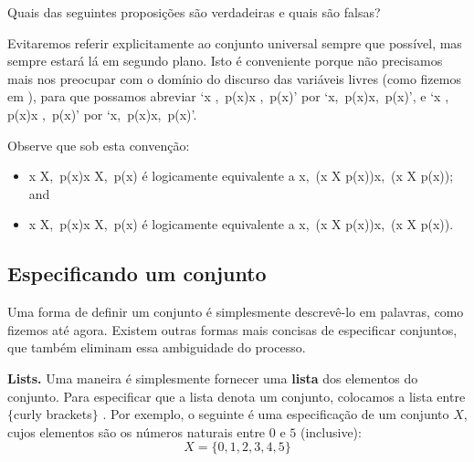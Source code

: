 \begin{exercise}
Quais das seguintes proposições são verdadeiras e quais são falsas?
  \in {} \qquad {} \in {} \qquad {} \in {} \qquad {} \in {} \qquad {} \in {}   \in {} \qquad {} \in {} \qquad {} \in {} \qquad {} \in {} \qquad {} \in {} 
\end{exercise}

Evitaremos referir explicitamente ao conjunto universal  sempre que possível, mas sempre estará lá em segundo plano. Isto é conveniente porque não precisamos mais nos preocupar com o domínio do discurso das variáveis ​​livres (como fizemos em ), para que possamos abreviar `\forall x \in {},\, p(x)\forall x \in {},\, p(x)' por `\forall x,\, p(x)\forall x,\, p(x)', e `\exists x \in {},\, p(x)\exists x \in {},\, p(x)' por `\exists x,\, p(x)\exists x,\, p(x)'.

Observe que sob esta convenção:
\begin{itemize}
\item \forall x \in X,\, p(x)\forall x \in X,\, p(x) é logicamente equivalente a \forall x,\, (x \in X \Rightarrow p(x))\forall x,\, (x \in X \Rightarrow p(x)); and
\item \exists x \in X,\, p(x)\exists x \in X,\, p(x) é logicamente equivalente a \exists x,\, (x \in X \wedge p(x))\exists x,\, (x \in X \wedge p(x)).
\end{itemize}

\subsection*{Especificando um conjunto}
Uma forma de definir um conjunto é simplesmente descrevê-lo em palavras, como fizemos até agora. Existem outras formas mais concisas de especificar conjuntos, que também eliminam essa ambiguidade do processo.

\textbf{Lists.}
Uma maneira é simplesmente fornecer uma \textbf{lista} dos elementos do conjunto. Para especificar que a lista denota um conjunto, colocamos a lista entre $\{$curly brackets$\}$ \inlatex{\{,\textbackslash{}\}}\lindexmmc{\{\dots\textbackslash{}\}}{$\{\dots\}$}. Por exemplo, o seguinte é uma especificação de um conjunto $X$, cujos elementos são os números naturais entre $0$ e $5$ (inclusive):
\[ X = \{ 0, 1, 2, 3, 4, 5 \} \]

